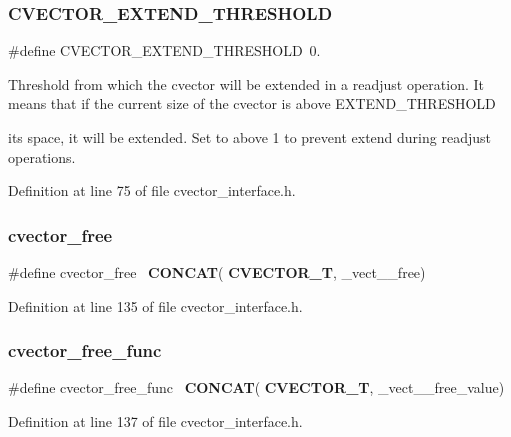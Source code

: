 \subsubsection{C\+V\+E\+C\+T\+O\+R\+\_\+\+E\+X\+T\+E\+N\+D\+\_\+\+T\+H\+R\+E\+S\+H\+O\+LD}
{\footnotesize\ttfamily \#define C\+V\+E\+C\+T\+O\+R\+\_\+\+E\+X\+T\+E\+N\+D\+\_\+\+T\+H\+R\+E\+S\+H\+O\+LD~0.}

Threshold from which the cvector will be extended in a readjust operation. It means that if the current size of the cvector is above E\+X\+T\+E\+N\+D\+\_\+\+T\+H\+R\+E\+S\+H\+O\+LD
\begin{DoxyItemize}
\item its space, it will be extended. Set to above 1 to prevent extend during readjust operations. 
\end{DoxyItemize}

Definition at line 75 of file cvector\+\_\+interface.\+h.

\mbox{\label{cvector__interface_8h_a70f45a7f52f1338650da6361c6ed343f}} 
\subsubsection{cvector\+\_\+free}
{\footnotesize\ttfamily \#define cvector\+\_\+free~\textbf{ C\+O\+N\+C\+AT}(\textbf{ C\+V\+E\+C\+T\+O\+R\+\_\+T}, \+\_\+vect\+\_\+\+\_\+free)}



Definition at line 135 of file cvector\+\_\+interface.\+h.

\mbox{\label{cvector__interface_8h_a373a516d422fd195c53c09c36cbe7d82}} 
\subsubsection{cvector\+\_\+free\+\_\+func}
{\footnotesize\ttfamily \#define cvector\+\_\+free\+\_\+func~\textbf{ C\+O\+N\+C\+AT}(\textbf{ C\+V\+E\+C\+T\+O\+R\+\_\+T}, \+\_\+vect\+\_\+\+\_\+free\+\_\+value)}



Definition at line 137 of file cvector\+\_\+interface.\+h.

